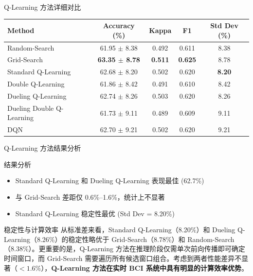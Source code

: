 {\begin{frame}{Q-Learning 方法详细对比}
    \begin{center}
    \footnotesize
    \renewcommand{\arraystretch}{1.3}
    \begin{tabular}{lcccc}
        \hline
        \textbf{Method} & \textbf{Accuracy (\%)} & \textbf{Kappa} & \textbf{F1} & \textbf{Std Dev (\%)} \\
        \hline
        Random-Search & 61.95 $\pm$ 8.38 & 0.492 & 0.611 & 8.38 \\
        Grid-Search & \textbf{63.35 $\pm$ 8.78} & \textbf{0.511} & \textbf{0.625} & 8.78 \\
        Standard Q-Learning & 62.68 $\pm$ 8.20 & 0.502 & 0.620 & \textbf{8.20} \\
        Double Q-Learning & 61.86 $\pm$ 8.42 & 0.491 & 0.610 & 8.42 \\
        Dueling Q-Learning & 62.74 $\pm$ 8.26 & 0.503 & 0.620 & 8.26 \\
        Dueling Double Q-Learning & 61.73 $\pm$ 9.11 & 0.489 & 0.609 & 9.11 \\
        DQN & 62.70 $\pm$ 9.21 & 0.502 & 0.620 & 9.21 \\
        \hline
    \end{tabular}
    \end{center}
\end{frame}

\begin{frame}{Q-Learning 方法结果分析}
    \begin{block}{结果分析}
        \footnotesize
        \begin{itemize}
            \item Standard Q-Learning 和 Dueling Q-Learning 表现最佳 (62.7\%)
            \item 与 Grid-Search 差距仅 0.6\%--1.6\%，统计上不显著
            \item Standard Q-Learning 稳定性最优 (Std Dev = 8.20\%)
        \end{itemize}
    \end{block}

    \vspace{0.2cm}
    \begin{block}{稳定性与计算效率}
        \footnotesize
        从标准差来看，Standard Q-Learning（8.20\%）和 Dueling Q-Learning（8.26\%）的稳定性略优于 Grid-Search（8.78\%）和 Random-Search（8.38\%）。更重要的是，Q-Learning 方法在推理阶段仅需单次前向传播即可确定时间窗口，而 Grid-Search 需要遍历所有候选窗口组合。考虑到两者性能差异不显著（$< 1.6\%$），\textbf{Q-Learning 方法在实时 BCI 系统中具有明显的计算效率优势}。
    \end{block}
\end{frame}

}
